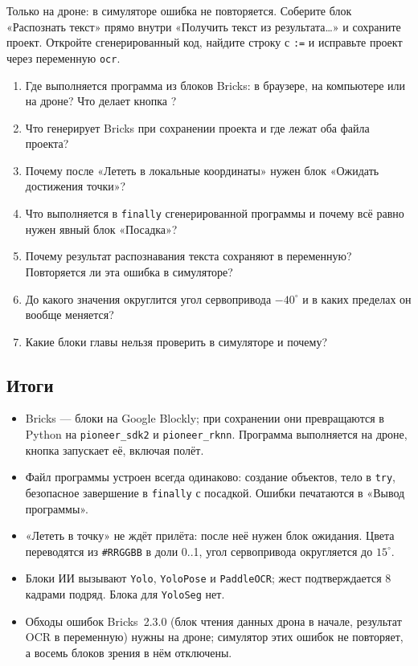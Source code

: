 \begin{taskbox}
Только на дроне: в симуляторе ошибка не повторяется. Соберите блок «Распознать текст» прямо внутри «Получить текст из результата…» и сохраните проект. Откройте сгенерированный код, найдите строку с \verb|:=| и исправьте проект через переменную \texttt{ocr}.
\end{taskbox}

\begin{questionbox}
\begin{enumerate}
    \item Где выполняется программа из блоков Bricks: в браузере, на компьютере или на дроне? Что делает кнопка ?
    \item Что генерирует Bricks при сохранении проекта и где лежат оба файла проекта?
    \item Почему после «Лететь в локальные координаты» нужен блок «Ожидать достижения точки»?
    \item Что выполняется в \verb|finally| сгенерированной программы и почему всё равно нужен явный блок «Посадка»?
    \item Почему результат распознавания текста сохраняют в переменную? Повторяется ли эта ошибка в симуляторе?
    \item До какого значения округлится угол сервопривода $-40^\circ$ и в каких пределах он вообще меняется?
    \item Какие блоки главы нельзя проверить в симуляторе и почему?
\end{enumerate}
\end{questionbox}

\subsection*{Итоги}
\begin{itemize}
    \item Bricks --- блоки на Google Blockly; при сохранении они превращаются в Python на \texttt{pioneer\_sdk2} и \texttt{pioneer\_rknn}. Программа выполняется на дроне, кнопка  запускает её, включая полёт.
    \item Файл программы устроен всегда одинаково: создание объектов, тело в \verb|try|, безопасное завершение в \verb|finally| с посадкой. Ошибки печатаются в «Вывод программы».
    \item «Лететь в точку» не ждёт прилёта: после неё нужен блок ожидания. Цвета переводятся из \texttt{\#RRGGBB} в доли 0..1, угол сервопривода округляется до $15^\circ$.
    \item Блоки ИИ вызывают \verb|Yolo|, \verb|YoloPose| и \verb|PaddleOCR|; жест подтверждается 8 кадрами подряд. Блока для \verb|YoloSeg| нет.
    \item Обходы ошибок Bricks~2.3.0 (блок чтения данных дрона в начале, результат OCR в переменную) нужны на дроне; симулятор этих ошибок не повторяет, а восемь блоков зрения в нём отключены.
\end{itemize}

